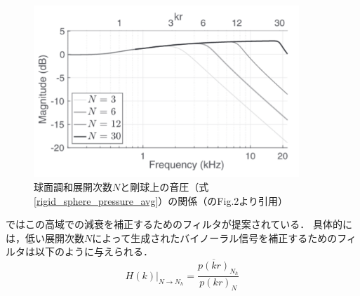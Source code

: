 \documentclass[a4paper]{jsarticle}
\begin{document}
\begin{figure}[htbp]
    \centering
    \label{high_freq_rolloff}
    \includegraphics[clip,width=10cm]{./high_freq_rolloff.png}
    \caption{球面調和展開次数$N$と剛球上の音圧（式\ref{rigid_sphere_pressure_avg}）の関係（\cite{Ben-Hur2017-gm}のFig.2より引用）}
\end{figure}

\cite{Sheaffer2014-bo}ではこの高域での減衰を補正するためのフィルタが提案されている．
具体的には，低い展開次数$N$によって生成されたバイノーラル信号を補正するためのフィルタは以下のように与えられる．
$$
    \left.H(k)\right|_{N \rightarrow N_{h}}=\frac{\overline{p(k r)}_{N_{h}}}{p(k r)_{N}}
$$



\end{document}
